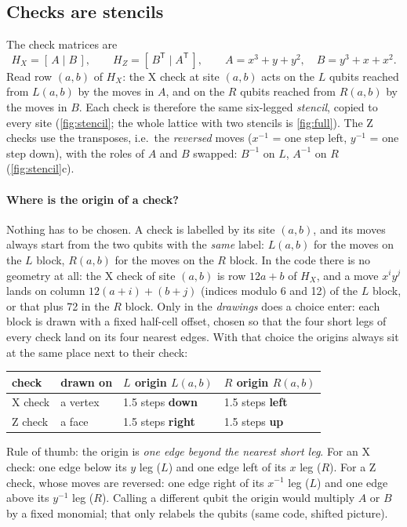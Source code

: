 \documentclass[11pt]{article}
\begin{document}
\subsection{Checks are stencils}
The check matrices are
\[
  H_X = [\,A \mid B\,],\qquad H_Z = [\,B^{\mathsf T}\mid A^{\mathsf T}\,],\qquad
  A = x^3+y+y^2,\quad B = y^3+x+x^2 .
\]
Read row $(a,b)$ of $H_X$: the X check at site $(a,b)$ acts on the $L$ qubits reached from
$L(a,b)$ by the moves in $A$, and on the $R$ qubits reached from $R(a,b)$ by the moves in $B$. Each check is therefore the
same six-legged \emph{stencil}, copied to every site (\cref{fig:stencil}; the whole lattice
with two stencils is \cref{fig:full}).
The Z checks use the transposes, i.e.\ the \emph{reversed} moves ($x^{-1}$ = one step left,
$y^{-1}$ = one step down), with the roles of $A$ and $B$ swapped: $B^{-1}$ on $L$, $A^{-1}$ on $R$
(\cref{fig:stencil}c).

\paragraph{Where is the origin of a check?} Nothing has to be chosen. A check is labelled by its
site $(a,b)$, and its moves always start from the two qubits with the \emph{same} label: $L(a,b)$
for the moves on the $L$ block, $R(a,b)$ for the moves on the $R$ block. In the code there is no
geometry at all: the X check of site $(a,b)$ is row $12a+b$ of $H_X$, and a move $x^iy^j$ lands on
column $12(a+i)+(b+j)$ (indices modulo 6 and 12) of the $L$ block, or that plus 72 in the $R$
block. Only in the \emph{drawings} does a choice enter: each block is drawn with a fixed
half-cell offset, chosen so that the four short legs of every check land on its four nearest
edges. With that choice the origins always sit at the same place next to their check:

\begin{center}
\begin{tabular}{llll}
\toprule
check & drawn on & $L$ origin $L(a,b)$ & $R$ origin $R(a,b)$ \\
\midrule
X check & a vertex & 1.5 steps \textbf{down} & 1.5 steps \textbf{left} \\
Z check & a face   & 1.5 steps \textbf{right} & 1.5 steps \textbf{up} \\
\bottomrule
\end{tabular}
\end{center}
Rule of thumb: the origin is \emph{one edge beyond the nearest short leg}. For an X check: one
edge below its $y$ leg ($L$) and one edge left of its $x$ leg ($R$). For a Z check, whose moves
are reversed: one edge right of its $x^{-1}$ leg ($L$) and one edge above its $y^{-1}$ leg ($R$).
Calling a different qubit the origin would multiply $A$ or $B$ by a fixed monomial; that only
relabels the qubits (same code, shifted picture).
\end{document}
